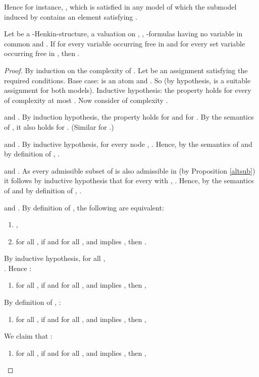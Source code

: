 \documentclass{LMCS}
\begin{document}
Hence for instance, , which is satisfied in any model  of which the submodel induced by  contains an element satisfying .


\begin{lem}
Let  be a -Henkin-structure,  a valuation on
, ,  -formulas having no variable in common and . If  for every variable  occurring
free in  and  for every
set variable  occurring free in , then . \label{rel}
\end{lem}

\begin{proof}
By induction on the complexity of . Let  be an
assignment satisfying the required conditions. Base case:
 is an atom and . So  (by hypothesis,  is a suitable assignment for both
models). Inductive hypothesis: the property holds for every
 of complexity at most . Now consider  of
complexity .
\begin{iteMize}{}
 \item   and . By induction hypothesis, the property holds for  and for . By the semantics of , it also holds for . (Similar for .)
 \item  and . By inductive hypothesis, for every node , . Hence, by the semantics of  and by definition of , .
 \item  and . As every admissible subset of  is also admissible in  (by Proposition
   \ref{altsub}) it follows by inductive hypothesis that for every  with , . Hence, by the semantics of  and by definition of , .
\item \sloppy and .
By definition of , the following are equivalent:
\begin{enumerate}[]
\item  ,
\item for all , if  and for all ,  and  implies , then .
\end{enumerate}
By inductive hypothesis, for all ,\\
 . Hence :
\begin{enumerate}
\item [] for all , if  and for all ,  and  implies , then ,
\end{enumerate}
By definition of , :
\begin{enumerate}
\item [] for all , if  and for all ,  and  implies , then ,
\end{enumerate}
We claim that :
\begin{enumerate}
\item []for all , if  and for all ,  and  implies , then ,
\end{enumerate}

\end{iteMize}
\end{proof}
\end{document}
